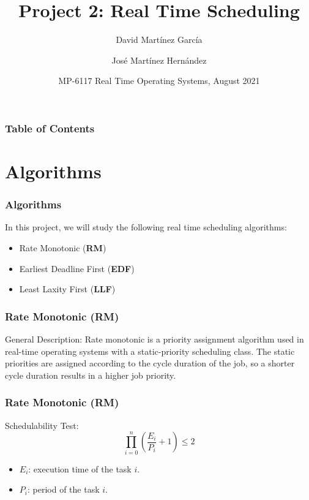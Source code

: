 \documentclass[xcolor=table]{beamer}
\title[Real Time Scheduling] %
{Project 2: Real Time Scheduling}
\author[ David Martínez, José Martínez] %
{David Martínez García\inst{1} \and José Martínez Hernández\inst{2}}
\institute[TEC] %
{
  \inst{1}%
  \url{david.martinez@estudiantec.cr}\\
  \textsc{2007058596}
  \and
  \inst{2}%
  \url{jpmh.1309@estudiantec.cr} \\
  \textsc{2020426476}
}
\date[August 2021] %
{MP-6117 Real Time Operating Systems, August 2021}
\begin{document}
\frame{\titlepage}


\begin{frame}
\frametitle{Table of Contents}
\tableofcontents
\end{frame}


\section{Algorithms}

\begin{frame}
\frametitle{Algorithms}
In this project, we will study the following real time scheduling algorithms:

\begin{itemize}
    \item Rate Monotonic (\textbf{RM})
    \item Earliest Deadline First (\textbf{EDF})
    \item Least Laxity First (\textbf{LLF})
\end{itemize}
\end{frame}


\begin{frame}
\frametitle{Rate Monotonic (\textbf{RM})}

\begin{alertblock}{General Description:}
Rate monotonic is a priority assignment algorithm used in real-time operating systems with a static-priority scheduling class. The static priorities are assigned according to the cycle duration of the job, so a shorter cycle duration results in a higher job priority.
\end{alertblock}

\end{frame}

\begin{frame}
\frametitle{Rate Monotonic (\textbf{RM})}

\begin{block}{Schedulability Test:}
\begin{equation}
\prod_{i=0}^{n} \left( \frac{E_i}{P_i}+1 \right) \leq 2
\end{equation}

\begin{itemize}
    \item $E_i$: execution time of the task $i$.
    \item $P_i$: period of the task $i$.
\end{itemize}
\end{block}

\end{frame}
\end{document}
